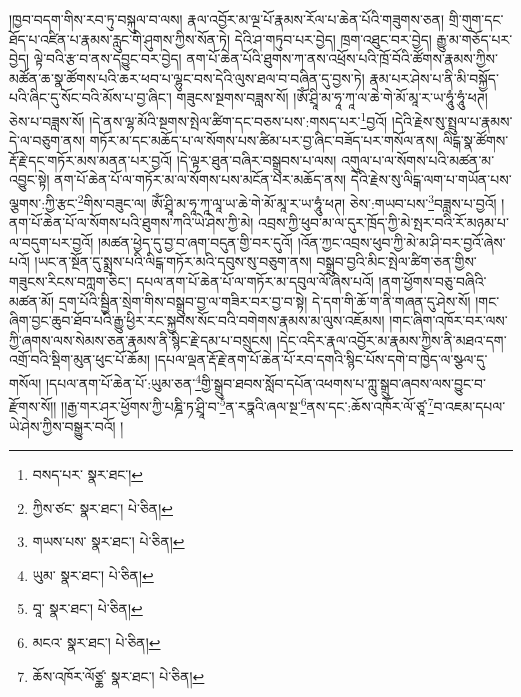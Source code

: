།ཁྱབ་བདག་གིས་རབ་ཏུ་བསྐུལ་བ་ལས། རྣལ་འབྱོར་མ་ལྔ་པོ་རྣམས་རོལ་པ་ཆེན་པོའི་གཟུགས་ཅན། གྲི་གུག་དང་ཐོད་པ་འཛིན་པ་རྣམས་རླུང་གི་ཤུགས་ཀྱིས་སོན་ཏེ། དེའི་ཤ་གཏུབ་པར་བྱེད། ཁྲག་འཐུང་བར་བྱེད། རྒྱུ་མ་གཅོད་པར་བྱེད། ལྟེ་བའི་རྩ་བ་ནས་དབྱུང་བར་བྱེད། ནག་པོ་ཆེན་པོའི་ཐུགས་ཀ་ནས་འཕྲོས་པའི་ཁྲོ་བོའི་ཚོགས་རྣམས་ཀྱིས་མཚོན་ཆ་སྣ་ཚོགས་པའི་ཆར་ཕབ་པ་ལྷུང་བས་དེའི་ལུས་ཐལ་བ་བཞིན་དུ་བྱས་ཏེ། རྣམ་པར་ཤེས་པ་ནི་མི་བསྐྱོད་པའི་ཞིང་དུ་སོང་བའི་མོས་པ་བྱ་ཞིང་། གཟུངས་སྔགས་བཟླས་སོ། །ཨོཾ་ཤྲཱི་མ་ཧཱ་ཀཱ་ལ་ཆེ་གེ་མོ་མཱ་ར་ཡ་ཧཱུཾ་ཧཱུཾ་ཕཊ། ཅེས་པ་བཟླས་སོ། །དེ་ནས་ལྷ་མོའི་སྔགས་སྤེལ་ཚིག་དང་བཅས་པས་:གསད་པར་\footnote{བསད་པར་  སྣར་ཐང་། }བྱའོ། །དེའི་རྗེས་སུ་སྤྲུལ་པ་རྣམས་དེ་ལ་བཅུག་ནས། གཏོར་མ་དང་མཆོད་པ་ལ་སོགས་པས་ཚིམ་པར་བྱ་ཞིང་བཟོད་པར་གསོལ་ནས། ལིངྒ་སྣ་ཚོགས་རྡོ་རྗེ་དང་གཏོར་མས་མནན་པར་བྱའོ། །དེ་ལྟར་ཐུན་བཞིར་བསྒྲུབས་པ་ལས། འགུལ་པ་ལ་སོགས་པའི་མཚན་མ་འབྱུང་སྟེ། ནག་པོ་ཆེན་པོ་ལ་གཏོར་མ་ལ་སོགས་པས་མངོན་པར་མཆོད་ནས། དེའི་རྗེས་སུ་ལིངྒ་ལག་པ་གཡོན་པས་ལྕགས་:ཀྱི་རྩང་\footnote{ཀྱིས་ཙང་  སྣར་ཐང་།  པེ་ཅིན། }གིས་བཟུང་ལ། ཨོཾ་ཤྲཱི་མ་ཧཱ་ཀཱ་ལཱ་ཡ་ཆེ་གེ་མོ་མཱ་ར་ཡ་ཧཱུཾ་ཕཊ། ཅེས་:གཡབ་པས་\footnote{གཡས་པས་  སྣར་ཐང་།  པེ་ཅིན། }བཟླས་པ་བྱའོ། །ནག་པོ་ཆེན་པོ་ལ་སོགས་པའི་ཐུགས་ཀའི་ཡེ་ཤེས་ཀྱི་མེ། འབྲས་ཀྱི་ཕུབ་མ་ལ་དུར་ཁྲོད་ཀྱི་མེ་སྤར་བའི་རོ་མཉམ་པ་ལ་བདུག་པར་བྱའོ། །མཚན་ཕྱེད་དུ་བྱ་བ་ཞག་བདུན་གྱི་བར་དུའོ། །འོན་ཀྱང་འབྲས་ཕུབ་ཀྱི་མེ་མ་ཤི་བར་བྱའོ་ཞེས་པའོ། །ཡང་ན་སྔོན་དུ་སྨྲས་པའི་ལིངྒ་གཏོར་མའི་དབུས་སུ་བཅུག་ནས། བསྒྲུབ་བྱའི་མིང་སྤེལ་ཚིག་ཅན་གྱིས་གཟུངས་རིངས་བཀླག་ཅིང་། དཔལ་ནག་པོ་ཆེན་པོ་ལ་གཏོར་མ་དབུལ་ལོ་ཞེས་པའོ། །ནག་ཕྱོགས་བཅུ་བཞིའི་མཚན་མོ། དྲག་པོའི་སྦྱིན་སྲེག་གིས་བསྒྲུབ་བྱ་ལ་གཟིར་བར་བྱ་བ་སྟེ། དེ་དག་གི་ཆོ་ག་ནི་གཞན་དུ་ཤེས་སོ། །གང་ཞིག་བྱང་ཆུབ་ཐོབ་པའི་རྒྱུ་ཕྱིར་རང་སྐྱབས་སོང་བའི་བགེགས་རྣམས་མ་ལུས་འཇོམས། །གང་ཞིག་འཁོར་བར་ལས་ཀྱི་ཞགས་ལས་སེམས་ཅན་རྣམས་ནི་སྙིང་རྗེ་དམ་པ་བསྲུངས། །དེང་འདིར་རྣལ་འབྱོར་མ་རྣམས་ཀྱིས་ནི་མཐའ་དག་འགྲོ་བའི་སྡིག་མུན་ཕུང་པོ་ཆོམ། །དཔལ་ལྡན་རྡོ་རྗེ་ནག་པོ་ཆེན་པོ་རབ་དགའི་སྙིང་པོས་དགེ་བ་ཁྱེད་ལ་སྩལ་དུ་གསོལ། །དཔལ་ནག་པོ་ཆེན་པོ་:ཡུམ་ཅན་\footnote{ཡུམ་  སྣར་ཐང་།  པེ་ཅིན། }གྱི་སྒྲུབ་ཐབས་སློབ་དཔོན་འཕགས་པ་ཀླུ་སྒྲུབ་ཞབས་ལས་བྱུང་བ་རྫོགས་སོ།། །།རྒྱ་གར་ཤར་ཕྱོགས་ཀྱི་པཎྜི་ཏ་ཤྲཱི་བ་\footnote{བཱ་  སྣར་ཐང་།  པེ་ཅིན། }ན་རཏྣའི་ཞལ་སྔ་\footnote{མངའ་  སྣར་ཐང་།  པེ་ཅིན། }ནས་དང་:ཆོས་འཁོར་ལོ་ཙཱ་\footnote{ཆོས་འཁོར་ལོཙྖ་  སྣར་ཐང་།  པེ་ཅིན། }བ་འཇམ་དཔལ་ཡེ་ཤེས་ཀྱིས་བསྒྱུར་བའོ། ། 